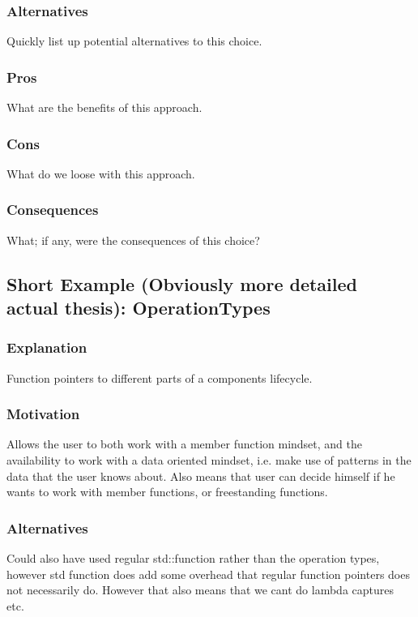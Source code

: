 \subsubsection{Alternatives}
Quickly list up potential alternatives to this choice.

\subsubsection{Pros}
What are the benefits of this approach.

\subsubsection{Cons}
What do we loose with this approach.

\subsubsection{Consequences}
What; if any, were the consequences of this choice?

\subsection{Short Example (Obviously more detailed actual thesis): OperationTypes}
\subsubsection{Explanation}
Function pointers to different parts of a components lifecycle.

\subsubsection{Motivation}
Allows the user to both work with a member function mindset,
and the availability to work with a data oriented mindset, i.e. make use of patterns in the data that the user knows about.
Also means that user can decide himself if he wants to work with member functions, or freestanding functions.

\subsubsection{Alternatives}
Could also have used regular std::function rather than the operation types,
however std function does add some overhead that regular function pointers does not necessarily do. However that also means that we cant do lambda captures etc.

